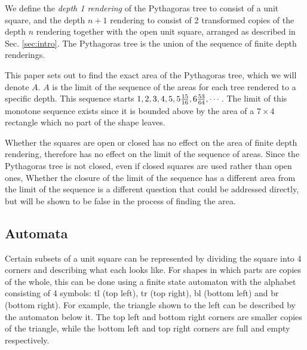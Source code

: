 \documentclass{article}
\begin{document}
We define the \emph{depth 1 rendering} of the Pythagoras tree to consist of a unit square, and the depth $n+1$ rendering to consist of 2 transformed copies of the depth $n$ rendering together with the open unit square, arranged as described in Sec. \ref{sec:intro}. The Pythagoras tree is the union of the sequence of finite depth renderings.


This paper sets out to find the exact area of the Pythagoras tree, which we will denote $A$. $A$ is the limit of the sequence of the areas for each tree rendered to a specific depth.
This sequence starts $1,2,3,4,5,5 {15\over 16},6 {53\over 64},\cdots$. The limit of this monotone sequence exists since it is bounded above by the area of a $7 \times 4$ rectangle which no part of the shape leaves.

Whether the squares are open or closed has no effect on the area of finite depth rendering, therefore has no effect on the limit of the sequence of areas. Since the Pythagoras tree is not closed, even if closed squares are used rather than open ones, 
Whether the closure of the limit of the sequence has a different area from the limit of the sequence is a different question that could be addressed directly, but will be shown to be false in the process of finding the area. 

\subsection{Automata}

\begin{wrapfigure}{l}{2.1cm}
\end{wrapfigure}

Certain subsets of a unit square can be represented by dividing the square into 4 corners and describing what each looks like. For shapes in which parts are copies of the whole, this can be done using a finite state automaton with the alphabet consisting of 4 symbols: tl (top left), tr (top right), bl (bottom left) and br (bottom right). For example, the triangle shown to the left can be described by the automaton below it. The top left and bottom right corners are smaller copies of the triangle, while the bottom left and top right corners are full and empty respectively.
\end{document}
